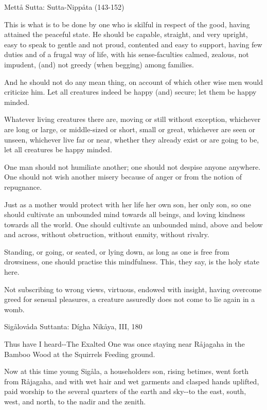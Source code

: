 \documentclass[12pt,twoside]{article}
\begin{document}
\bigskip


\bigskip

Mett{\aa} Sutta: Sutta{}-Nipp{\aa}ta (143{}-152)


\bigskip

This is what is to be done by one who is skilful in respect of the good,
having attained the peaceful state. He should be capable, straight, and
very upright, easy to speak to gentle and not proud, contented and easy
to support, having few duties and of a frugal way of life, with his
sense{}-faculties calmed, zealous, not impudent, (and) not greedy (when
begging) among families.

And he should not do any mean thing, on account of which other wise men
would criticize him. Let all creatures indeed be happy (and) secure;
let them be happy minded.

Whatever living creatures there are, moving or still without exception,
whichever are long or large, or middle{}-sized or short, small or
great, whichever are seen or unseen, whichever live far or near,
whether they already exist or are going to be, let all creatures be
happy minded.

One man should not humiliate another; one should not despise anyone
anywhere. One should not wish another misery because of anger or from
the notion of repugnance.

Just as a mother would protect with her life her own son, her only son,
so one should cultivate an unbounded mind towards all beings, and
loving kindness towards all the world. One should cultivate an
unbounded mind, above and below and across, without obstruction,
without enmity, without rivalry.

Standing, or going, or seated, or lying down, as long as one is free
from drowsiness, one should practise this mindfulness. This, they say,
is the holy state here.

Not subscribing to wrong views, virtuous, endowed with insight, having
overcome greed for sensual pleasures, a creature assuredly does not
come to lie again in a womb.


\bigskip

\clearpage
Sig{\aa}lov{\aa}da Suttanta: D\'igha Nik{\aa}ya, III, 180


\bigskip

Thus have I heard{}-{}-The Exalted One was once staying near
R{\aa}jagaha in the Bamboo Wood at the Squirrels{\textquotesingle}
Feeding ground.

Now at this time young Sig{\aa}la, a householder{\textquotesingle}s son,
rising betimes, went forth from R{\aa}jagaha, and with wet hair and wet
garments and clasped hands uplifted, paid worship to the several
quarters of the earth and sky{}-{}-to the east, south, west, and north,
to the nadir and the zenith.
\end{document}

